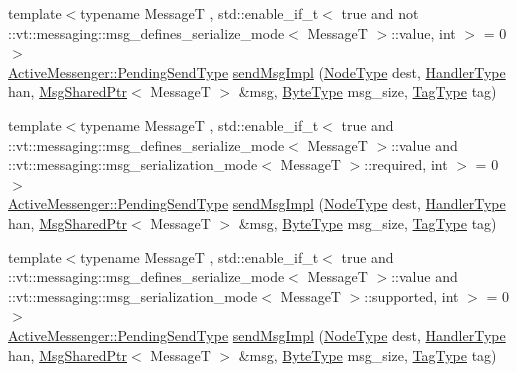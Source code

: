\begin{DoxyCompactItemize}
\item 
{\footnotesize template$<$typename MessageT , std\+::enable\+\_\+if\+\_\+t$<$ true and not \+::vt\+::messaging\+::msg\+\_\+defines\+\_\+serialize\+\_\+mode$<$ Message\+T $>$\+::value, int $>$  = 0$>$ }\\\hyperlink{structvt_1_1messaging_1_1_active_messenger_a3626a6ca76d8ad4ec7c3b47a2c70d3a8}{Active\+Messenger\+::\+Pending\+Send\+Type} \hyperlink{structvt_1_1messaging_1_1_active_messenger_a7f2e8867a9d967eb7f43df7d5c420775}{send\+Msg\+Impl} (\hyperlink{namespacevt_a866da9d0efc19c0a1ce79e9e492f47e2}{Node\+Type} dest, \hyperlink{namespacevt_af64846b57dfcaf104da3ef6967917573}{Handler\+Type} han, \hyperlink{structvt_1_1messaging_1_1_msg_shared_ptr}{Msg\+Shared\+Ptr}$<$ MessageT $>$ \&msg, \hyperlink{namespacevt_aab8d55968084610ce3b17057981e9300}{Byte\+Type} msg\+\_\+size, \hyperlink{namespacevt_a84ab281dae04a52a4b243d6bf62d0e52}{Tag\+Type} tag)
\item 
{\footnotesize template$<$typename MessageT , std\+::enable\+\_\+if\+\_\+t$<$ true and \+::vt\+::messaging\+::msg\+\_\+defines\+\_\+serialize\+\_\+mode$<$ Message\+T $>$\+::value and \+::vt\+::messaging\+::msg\+\_\+serialization\+\_\+mode$<$ Message\+T $>$\+::required, int $>$  = 0$>$ }\\\hyperlink{structvt_1_1messaging_1_1_active_messenger_a3626a6ca76d8ad4ec7c3b47a2c70d3a8}{Active\+Messenger\+::\+Pending\+Send\+Type} \hyperlink{structvt_1_1messaging_1_1_active_messenger_a7f2e8867a9d967eb7f43df7d5c420775}{send\+Msg\+Impl} (\hyperlink{namespacevt_a866da9d0efc19c0a1ce79e9e492f47e2}{Node\+Type} dest, \hyperlink{namespacevt_af64846b57dfcaf104da3ef6967917573}{Handler\+Type} han, \hyperlink{structvt_1_1messaging_1_1_msg_shared_ptr}{Msg\+Shared\+Ptr}$<$ MessageT $>$ \&msg, \hyperlink{namespacevt_aab8d55968084610ce3b17057981e9300}{Byte\+Type} msg\+\_\+size, \hyperlink{namespacevt_a84ab281dae04a52a4b243d6bf62d0e52}{Tag\+Type} tag)
\item 
{\footnotesize template$<$typename MessageT , std\+::enable\+\_\+if\+\_\+t$<$ true and \+::vt\+::messaging\+::msg\+\_\+defines\+\_\+serialize\+\_\+mode$<$ Message\+T $>$\+::value and \+::vt\+::messaging\+::msg\+\_\+serialization\+\_\+mode$<$ Message\+T $>$\+::supported, int $>$  = 0$>$ }\\\hyperlink{structvt_1_1messaging_1_1_active_messenger_a3626a6ca76d8ad4ec7c3b47a2c70d3a8}{Active\+Messenger\+::\+Pending\+Send\+Type} \hyperlink{structvt_1_1messaging_1_1_active_messenger_a7f2e8867a9d967eb7f43df7d5c420775}{send\+Msg\+Impl} (\hyperlink{namespacevt_a866da9d0efc19c0a1ce79e9e492f47e2}{Node\+Type} dest, \hyperlink{namespacevt_af64846b57dfcaf104da3ef6967917573}{Handler\+Type} han, \hyperlink{structvt_1_1messaging_1_1_msg_shared_ptr}{Msg\+Shared\+Ptr}$<$ MessageT $>$ \&msg, \hyperlink{namespacevt_aab8d55968084610ce3b17057981e9300}{Byte\+Type} msg\+\_\+size, \hyperlink{namespacevt_a84ab281dae04a52a4b243d6bf62d0e52}{Tag\+Type} tag)

\end{DoxyCompactItemize}
